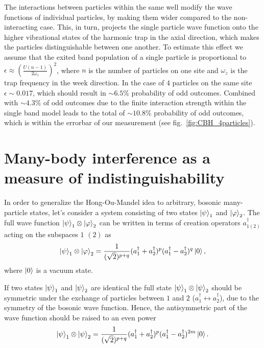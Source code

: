 The interactions between particles within the same well modify the wave functions of individual particles, by making them wider compared to the non-interacting case. This, in turn, projects the single particle wave function onto the higher vibrational states of the harmonic trap in the axial direction, which makes the particles distinguishable between one another. To estimate this effect we assume that the exited band population of a single particle is proportional to $\epsilon \approx \left(\frac{U(n-1)}{2 \omega_z}\right)^2$, where $n$ is the number of particles on one site and $\omega_z$ is the trap frequency in the week direction. In the case of $4$ particles on the same site $\epsilon\sim0.017$, which should result in $\sim 6.5\%$ probability of odd outcomes. Combined with $\sim 4.3\%$ of odd outcomes due to the finite interaction strength within the single band model leads to the total of $\sim 10.8\%$ probability of odd outcomes, which is within the errorbar of our measurement (see fig.~\ref{fig:CBH_4particles}).

\section{Many-body interference as a measure of indistinguishability}
In order to generalize the Hong-Ou-Mandel idea to arbitrary, bosonic many-particle states, let's consider a system consisting of two states $\left|\psi\right\rangle_1$ and $\left|\varphi\right\rangle_2$. The full wave function $\left|\psi\right\rangle_1 \otimes \left|\varphi\right\rangle_2$ can be written in terms of creation operators $a_{1(2)}^{\dagger}$ acting on the subspaces $1$ $(2)$ as
\begin{equation}
\left|\psi\right\rangle_1 \otimes \left|\varphi\right\rangle_2 = \frac{1}{(\sqrt{2})^{p+q}}(a^{\dagger}_1 + a^{\dagger}_2)^p(a^{\dagger}_1 - a^{\dagger}_2)^q\left|0\right\rangle,
\end{equation}
where $\left|0\right\rangle$ is a vacuum state.

If two states $\left|\psi\right\rangle_1$ and $\left|\psi\right\rangle_2$ are identical the full state $\left|\psi\right\rangle_1 \otimes \left|\psi\right\rangle_2$ should be symmetric under the exchange of particles between $1$ and $2$ ($a_{1}^{\dagger} \leftrightarrow a_2^{\dagger}$), due to the symmetry of the bosonic wave function. Hence, the antisymmetric part of the wave function should be raised to an even power
\begin{equation}
\left|\psi\right\rangle_1 \otimes \left|\psi\right\rangle_2 = \frac{1}{(\sqrt{2})^{p+q}}(a^{\dagger}_1 + a^{\dagger}_2)^p(a^{\dagger}_1 - a^{\dagger}_2)^{2m}\left|0\right\rangle.
\end{equation}


